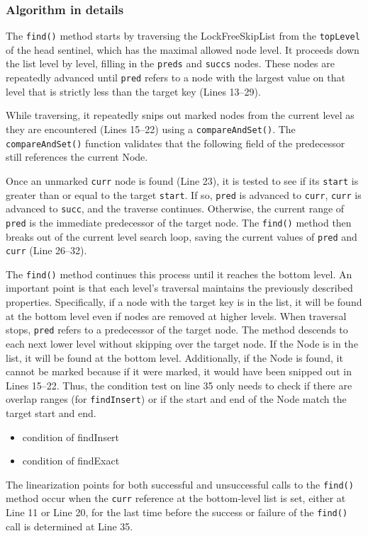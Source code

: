 \subsubsection{Algorithm in details}
The \texttt{find()} method starts by traversing the LockFreeSkipList from the \texttt{topLevel} of the head sentinel, which has the maximal allowed node level.
It proceeds down the list level by level, filling in the \texttt{preds} and \texttt{succs} nodes.
These nodes are repeatedly advanced until \texttt{pred} refers to a node with the largest value on that level that is strictly less than the target key (Lines 13--29).

While traversing, it repeatedly snips out marked nodes from the current level as they are encountered (Lines 15--22) using a \texttt{compareAndSet()}.
The \texttt{compareAndSet()} function validates that the following field of the predecessor still references the current Node.

Once an unmarked \texttt{curr} node is found (Line 23), it is tested to see if its \texttt{start} is greater than or equal to the target \texttt{start}.
If so, \texttt{pred} is advanced to \texttt{curr}, \texttt{curr} is advanced to \texttt{succ}, and the traverse continues.
Otherwise, the current range of \texttt{pred} is the immediate predecessor of the target node.
The \texttt{find()} method then breaks out of the current level search loop, saving the current values of \texttt{pred} and \texttt{curr} (Line 26--32).

The \texttt{find()} method continues this process until it reaches the bottom level.
An important point is that each level's traversal maintains the previously described properties.
Specifically, if a node with the target key is in the list, it will be found at the bottom level even if nodes are removed at higher levels.
When traversal stops, \texttt{pred} refers to a predecessor of the target node.
The method descends to each next lower level without skipping over the target node.
If the Node is in the list, it will be found at the bottom level.
Additionally, if the Node is found, it cannot be marked because if it were marked, it would have been snipped out in Lines 15--22.
Thus, the condition test on line 35 only needs to check if there are overlap ranges (for \texttt{findInsert}) or if the start and end of the Node match the target start and end.

\begin{itemize}
    \item condition of findInsert
    \item condition of findExact
\end{itemize}

The linearization points for both successful and unsuccessful calls to the \texttt{find()} method occur when the \texttt{curr} reference at the bottom-level list is set, either at Line 11 or Line 20, for the last time before the success or failure of the \texttt{find()} call is determined at Line 35.